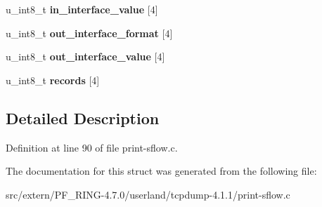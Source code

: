 \begin{DoxyCompactItemize}
\item 
\hypertarget{structsflow__expanded__flow__sample__t_a5d83214993f2ab9f2bfa49a60ecabc41}{
u\_\-int8\_\-t {\bfseries in\_\-interface\_\-value} \mbox{[}4\mbox{]}}
\label{structsflow__expanded__flow__sample__t_a5d83214993f2ab9f2bfa49a60ecabc41}

\item 
\hypertarget{structsflow__expanded__flow__sample__t_a79a72d4ce8e79b25fca69201a2aa5def}{
u\_\-int8\_\-t {\bfseries out\_\-interface\_\-format} \mbox{[}4\mbox{]}}
\label{structsflow__expanded__flow__sample__t_a79a72d4ce8e79b25fca69201a2aa5def}

\item 
\hypertarget{structsflow__expanded__flow__sample__t_a77e17c038993f379115c0cfc75af84f6}{
u\_\-int8\_\-t {\bfseries out\_\-interface\_\-value} \mbox{[}4\mbox{]}}
\label{structsflow__expanded__flow__sample__t_a77e17c038993f379115c0cfc75af84f6}

\item 
\hypertarget{structsflow__expanded__flow__sample__t_ac3d644b313edfdfe034386b54908dfa4}{
u\_\-int8\_\-t {\bfseries records} \mbox{[}4\mbox{]}}
\label{structsflow__expanded__flow__sample__t_ac3d644b313edfdfe034386b54908dfa4}

\end{DoxyCompactItemize}


\subsection{Detailed Description}


Definition at line 90 of file print-\/sflow.c.



The documentation for this struct was generated from the following file:\begin{DoxyCompactItemize}
\item 
src/extern/PF\_\-RING-\/4.7.0/userland/tcpdump-\/4.1.1/print-\/sflow.c\end{DoxyCompactItemize}
